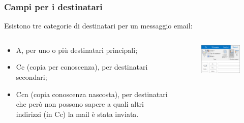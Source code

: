 \documentclass[]{beamer}
\begin{document}
\begin{frame}
\frametitle{Campi per i destinatari}
Esistono tre categorie di destinatari per un messaggio email:
\begin{columns}
  \begin{column}{0.5\textwidth}
  \begin{itemize}
   \item \alert<1>{A}, per uno o più destinatari principali;\pause
   \item \alert<2>{Cc} (copia per conoscenza), per destinatari secondari;\pause
   \item \alert<3>{Ccn} (copia conoscenza nascosta), per destinatari che però non possono sapere a quali altri indirizzi (in Cc) la mail è stata inviata.
  \end{itemize}
  \end{column}
  \begin{column}{0.4\textwidth}
  \begin{figure}
  \includegraphics[width=\columnwidth]{img/accccn.png}
  \end{figure}
  \end{column}
\end{columns}
\end{frame}
\end{document}
